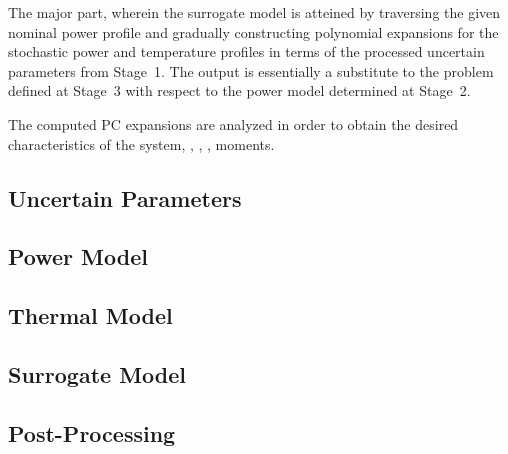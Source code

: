  The major part, wherein the surrogate model is atteined by traversing the given nominal power profile and gradually constructing polynomial expansions for the stochastic power and temperature profiles in terms of the processed uncertain parameters from Stage~1. The output is essentially a substitute to the problem defined at Stage~3 with respect to the power model determined at Stage~2.

 The computed PC expansions are analyzed in order to obtain the desired characteristics of the system, \eg, \cdfs, \pdfs, moments.

\subsection{Uncertain Parameters} 


\subsection{Power Model} 


\subsection{Thermal Model} 


\subsection{Surrogate Model} 


\subsection{Post-Processing} 

